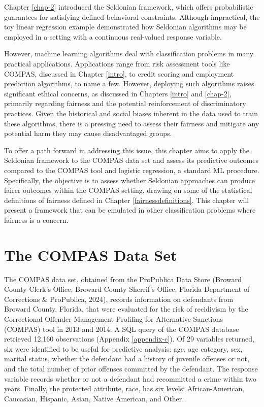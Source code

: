 \documentclass[12pt, twoside]{amherstthesis}
\begin{document}
Chapter \ref{chap-2} introduced the Seldonian framework, which offers probabilistic guarantees for satisfying defined behavioral constraints. Although impractical, the toy linear regression example demonstrated how Seldonian algorithms may be employed in a setting with a continuous real-valued response variable.

However, machine learning algorithms deal with classification problems in many practical applications. Applications range from risk assessment tools like COMPAS, discussed in Chapter \ref{intro}, to credit scoring and employment prediction algorithms, to name a few. However, deploying such algorithms raises significant ethical concerns, as discussed in Chapters \ref{intro} and \ref{chap-2}, primarily regarding fairness and the potential reinforcement of discriminatory practices. Given the historical and social biases inherent in the data used to train these algorithms, there is a pressing need to assess their fairness and mitigate any potential harm they may cause disadvantaged groups.

To offer a path forward in addressing this issue, this chapter aims to apply the Seldonian framework to the COMPAS data set and assess its predictive outcomes compared to the COMPAS tool and logistic regression, a standard ML procedure. Specifically, the objective is to assess whether Seldonian approaches can produce fairer outcomes within the COMPAS setting, drawing on some of the statistical definitions of fairness defined in Chapter \ref{fairnessdefinitions}. This chapter will present a framework that can be emulated in other classification problems where fairness is a concern.

\hypertarget{the-compas-data-set}{%
\section{The COMPAS Data Set}\label{the-compas-data-set}}

The COMPAS data set, obtained from the ProPublica Data Store (Broward County Clerk's Office, Broward County Sherrif's Office, Florida Department of Corrections \& ProPublica, 2024), records information on defendants from Broward County, Florida, that were evaluated for the risk of recidivism by the Correctional Offender Management Profiling for Alternative Sanctions (COMPAS) tool in 2013 and 2014. A SQL query of the COMPAS database retrieved 12,160 observations (Appendix \ref{appendix-c}). Of 29 variables returned, six were identified to be useful for predictive analysis: age, age category, sex, marital status, whether the defendant had a history of juvenile offenses or not, and the total number of prior offenses committed by the defendant. The response variable records whether or not a defendant had recommitted a crime within two years. Finally, the protected attribute, race, has six levels: African-American, Caucasian, Hispanic, Asian, Native American, and Other.
\end{document}
